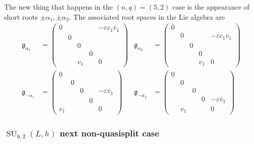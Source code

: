 \documentclass[12pt]{article}
\theoremstyle{definition}
\numberwithin{theorem}{subsection}
\newcommand{\eps}{\varepsilon}
\newcommand{\incomplete}{\textcolor{red}{INCOMPLETE}}
\newcommand{\ov}{\overline}
\newcommand{\frakg}{\mathfrak{g}}
\DeclareMathOperator{\SU}{SU}
\begin{document}
The new thing that happens in the $(n,q) = (5,2)$ case is the appearance of short roots $\pm \alpha_1, \pm \alpha_2$. The associated root spaces in the Lie algebra are
\begin{align*}
	\frakg_{\alpha_1} &=
	\begin{pmatrix}
		0 &&&& -\eps c_1 \ov v_1 \\
		& 0  \\
		&& 0  \\
		&&& 0  \\
		&& v_1 && 0
	\end{pmatrix} &
	\frakg_{\alpha_2} &=
	\begin{pmatrix}
		0 \\
		& 0 &&& - \eps c_1 \ov v_1 \\
		&& 0  \\
		&&& 0  \\
		&&& v_1 & 0
	\end{pmatrix} \\
	\frakg_{-\alpha_1} &=
	\begin{pmatrix}
		0  \\
		& 0  \\
		&& 0 && - \eps \ov v_1  \\
		&&& 0  \\
		v_1 &&&& 0
	\end{pmatrix} &
	\frakg_{-\alpha_2} &=
	\begin{pmatrix}
		0  \\
		& 0  \\
		&& 0   \\
		&&& 0 &  - \eps \ov v_1 \\
		& v_1 &&& 0
	\end{pmatrix}
\end{align*}

\subsubsection{$\SU_{6,2}(L,h)$ next non-quasisplit case}
\end{document}
